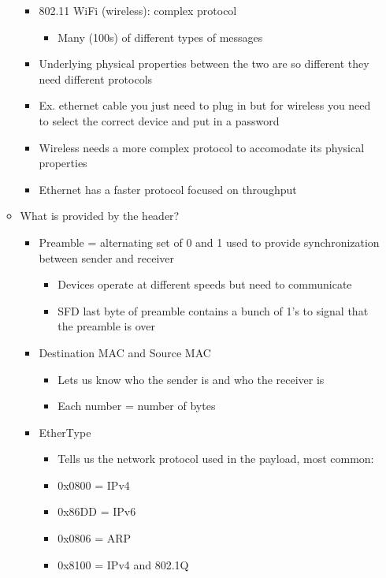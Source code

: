 \documentclass{article}
\begin{document}
\begin{itemize}
\begin{itemize}
\begin{itemize}
        \item 802.11 WiFi (wireless): complex protocol
        \begin{itemize}
            \item Many (100s) of different types of messages
        \end{itemize}
        \item Underlying physical properties between the two are so different they need different protocols
        \item Ex. ethernet cable you just need to plug in but for wireless you need to select the correct device and put in a password
        \item Wireless needs a more complex protocol to accomodate its physical properties
        \item Ethernet has a faster protocol focused on throughput 
    \end{itemize}
    \item What is provided by the header?
    \begin{itemize}
        \item Preamble = alternating set of 0 and 1 used to provide synchronization between sender and receiver 
        \begin{itemize}
            \item Devices operate at different speeds but need to communicate
            \item SFD last byte of preamble contains a bunch of 1's to signal that the preamble is over
        \end{itemize}
        \item Destination MAC and Source MAC
        \begin{itemize}
            \item Lets us know who the sender is and who the receiver is 
            \item Each number = number of bytes
        \end{itemize}
        \item EtherType
        \begin{itemize}
            \item Tells us the network protocol used in the payload, most common:
            \item 0x0800 = IPv4
            \item 0x86DD = IPv6
            \item 0x0806 = ARP 
            \item 0x8100 = IPv4 and 802.1Q
        \end{itemize}

\end{itemize}
\end{itemize}
\end{itemize}
\end{document}
